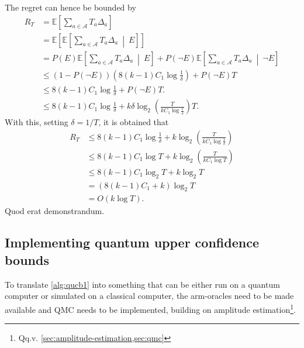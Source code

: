 The regret can hence be bounded by
\begin{equation}
    \begin{aligned}
        R_T
         & =
        \mathbb{E}\left[ \sum_{a \in \mathcal{A}} T_a \Delta_a \right]
        \\
         & =
        \mathbb{E}\left[ \mathbb{E}\left[ \sum_{a \in \mathcal{A}} T_a \Delta_a \ \middle| \ E \right] \right]
        \\
         & = P(E) \mathbb{E}\left[ \sum_{a \in \mathcal{A}} T_a \Delta_a \ \middle| \ E \right] + P(\neg E) \mathbb{E}\left[ \sum_{a \in \mathcal{A}} T_a \Delta_a \ \middle| \ \neg E \right]
        \\
         & \leq
        (1 - P(\neg E)) \left( 8(k-1)C_1 \log \frac1\delta \right)
        + P(\neg E) T
        \\
         & \leq
        8(k-1)C_1 \log \frac1\delta + P(\neg E) T.
        \\
         & \leq
        8(k-1)C_1 \log \frac1\delta + k\delta \log_2 \left(\frac{T}{kC_1 \log \frac1\delta}\right) T.
    \end{aligned}
\end{equation}
With this, setting $\delta = 1/T$, it is obtained that
\begin{equation}
    \begin{aligned}
        R_T
         & \leq
        8(k-1)C_1 \log \frac1\delta + k \log_2 \left(\frac{T}{kC_1 \log \frac1\delta}\right)
        \\
         & \leq
        8(k-1)C_1 \log T + k \log_2 \left(\frac{T}{kC_1 \log T}\right)
        \\
         & \leq
        8(k-1)C_1 \log_2 T + k \log_2 T
        \\
         & =
        (8(k-1)C_1 + k) \log_2 T
        \\
         & =
        O(k \log T).
    \end{aligned}
\end{equation}
Quod erat demonstrandum.

\subsection{Implementing quantum upper confidence bounds}
\label{sec:qucb-implementation}
To translate \cref{alg:qucb1} into something that can be either run on a quantum computer or simulated on a classical computer, the arm-oracles need to be made available and QMC needs to be implemented, building on amplitude estimation\footnote{Qq.v. \cref{sec:amplitude-estimation,sec:qmc}}.


